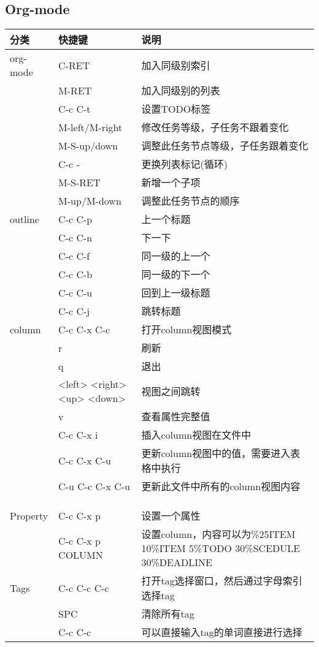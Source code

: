 \documentclass[10pt,a4paper]{article}
\begin{document}
\subsection{Org-mode}
\label{sec-3-2}
\begin{center}
\begin{tabular}{lll}
分类 & 快捷键 & 说明\\
\hline
org-mode & C-RET & 加入同级别索引\\
 & M-RET & 加入同级别的列表\\
 & C-c C-t & 设置TODO标签\\
 & M-left/M-right & 修改任务等级，子任务不跟着变化\\
 & M-S-up/down & 调整此任务节点等级，子任务跟着变化\\
 & C-c - & 更换列表标记(循环)\\
 & M-S-RET & 新增一个子项\\
 & M-up/M-down & 调整此任务节点的顺序\\
\hline
outline & C-c C-p & 上一个标题\\
 & C-c C-n & 下一下\\
 & C-c C-f & 同一级的上一个\\
 & C-c C-b & 同一级的下一个\\
 & C-c C-u & 回到上一级标题\\
 & C-c C-j & 跳转标题\\
\hline
column & C-c C-x C-c & 打开column视图模式\\
 & r & 刷新\\
 & q & 退出\\
 & <left> <right> <up> <down> & 视图之间跳转\\
 & v & 查看属性完整值\\
 & C-c C-x i & 插入column视图在文件中\\
 & C-c C-x C-u & 更新column视图中的值，需要进入表格中执行\\
 & C-u C-c C-x C-u & 更新此文件中所有的column视图内容\\
 &  & \\
 &  & \\
 &  & \\
\hline
Property & C-c C-x p & 设置一个属性\\
 & C-c C-x p COLUMN & 设置column，内容可以为\%25ITEM 10\%ITEM 5\%TODO 30\%SCEDULE 30\%DEADLINE\\
\hline
Tags & C-c C-c C-c & 打开tag选择窗口，然后通过字母索引选择tag\\
 & SPC & 清除所有tag\\
 & C-c C-c & 可以直接输入tag的单词直接进行选择\\

\end{tabular}
\end{center}
\end{document}
